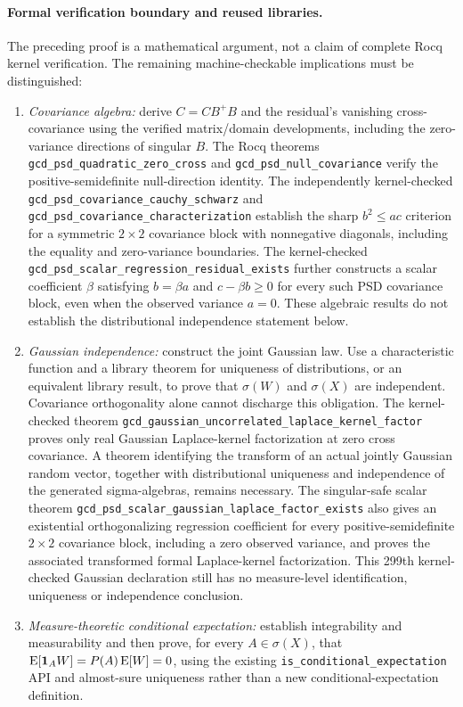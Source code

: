 \paragraph{Formal verification boundary and reused libraries.}
The preceding proof is a mathematical argument, not a claim of complete
Rocq kernel verification. The remaining machine-checkable implications
must be distinguished:
\begin{enumerate}[leftmargin=*,nosep]
\item \emph{Covariance algebra:} derive
      \(C=CB^+B\) and the residual's vanishing cross-covariance
      using the verified matrix/domain developments, including
      the zero-variance directions of singular \(B\). The Rocq
      theorems \nolinkurl{gcd_psd_quadratic_zero_cross} and
      \nolinkurl{gcd_psd_null_covariance} verify the
      positive-semidefinite null-direction identity. The independently
      kernel-checked \nolinkurl{gcd_psd_covariance_cauchy_schwarz}
      and \nolinkurl{gcd_psd_covariance_characterization} establish
      the sharp \(b^2\leq ac\) criterion for a symmetric
      \(2\times2\) covariance block with nonnegative diagonals,
      including the equality and zero-variance boundaries.
      The kernel-checked
      \nolinkurl{gcd_psd_scalar_regression_residual_exists}
      further constructs a scalar coefficient \(\beta\) satisfying
      \(b=\beta a\) and \(c-\beta b\geq0\) for every such PSD
      covariance block, even when the observed variance \(a=0\).
      These algebraic results do not establish the distributional
      independence statement below.
\item \emph{Gaussian independence:} construct the joint Gaussian law.
      Use a characteristic function and a library theorem for uniqueness
      of distributions, or an equivalent library result, to prove that
      \(\sigma(W)\) and \(\sigma(X)\) are independent. Covariance
      orthogonality alone cannot discharge this obligation.
      The kernel-checked theorem
      \nolinkurl{gcd_gaussian_uncorrelated_laplace_kernel_factor}
      proves only real Gaussian Laplace-kernel factorization at zero
      cross covariance. A theorem identifying the transform of an
      actual jointly Gaussian random vector, together with
      distributional uniqueness and independence of the generated
      sigma-algebras, remains necessary.
      The singular-safe scalar theorem
      \nolinkurl{gcd_psd_scalar_gaussian_laplace_factor_exists}
      also gives an existential orthogonalizing regression coefficient
      for every positive-semidefinite \(2\times2\) covariance block,
      including a zero observed variance, and proves the associated
      transformed formal Laplace-kernel factorization. This 299th
      kernel-checked Gaussian declaration still has no measure-level
      identification, uniqueness or independence conclusion.
\item \emph{Measure-theoretic conditional expectation:} establish
      integrability and measurability and then prove, for every
      \(A\in\sigma(X)\), that
      \(\operatorname{E}[\mathbf{1}_A W]=P(A)\operatorname{E}[W]=0\), using the existing
      \nolinkurl{is_conditional_expectation} API and almost-sure
      uniqueness rather than a new conditional-expectation definition.
\end{enumerate}
